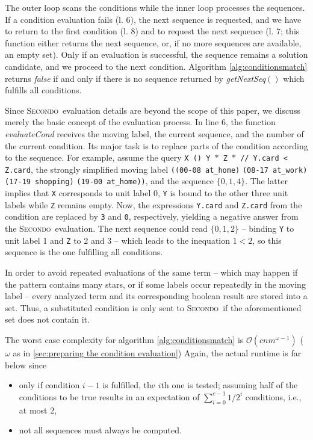 \documentclass{sig-alternate}
\newcommand{\ic}[1]{\textit{#1}}
\newcommand{\secondo}{\textsc{Secondo}}
\begin{document}
The outer loop scans the conditions while the inner loop processes the sequences. If a condition evaluation fails (l. 6), the next sequence is requested, and we have to return to the first condition (l. 8) and to request the next sequence (l. 7; this function either returns the next sequence, or, if no more sequences are available, an empty set). Only if an evaluation is successful, the sequence remains a solution candidate, and we proceed to the next condition. Algorithm \ref{alg:conditionsmatch} returns \ic{false} if and only if there is no sequence returned by \ic{getNextSeq$()$} which fulfills all conditions.

Since \secondo\ evaluation details are beyond the scope of this paper, we discuss merely the basic concept of the evaluation process. In line 6, the function \ic{evaluateCond} receives the moving label, the current sequence, and the number of the current condition. Its major task is to replace parts of the condition according to the sequence. For example, assume the query \texttt{X () Y $\ast$ Z $\ast$ // Y.card < Z.card}, the strongly simplified moving label \texttt{((00-08 at\_home)} \texttt{(08-17 at\_work)} \texttt{(17-19 shopping)} \texttt{(19-00 at\_home))}, and the sequence $\{0,1,4\}$. The latter implies that \texttt{X} corresponds to unit label 0, \texttt{Y} is bound to the other three unit labels while \texttt{Z} remains empty. Now, the expressions \texttt{Y.card} and \texttt{Z.card} from the condition are replaced by \texttt{3} and \texttt{0}, respectively, yielding a negative answer from the \secondo\ evaluation. The next sequence could read $\{0,1,2\}$ -- binding \texttt{Y} to unit label 1 and \texttt{Z} to 2 and 3 -- which leads to the inequation $1<2$, so this sequence is the one fulfilling all conditions.

In order to avoid repeated evaluations of the same term -- which may happen if the pattern contains many stars, or if some labels occur repeatedly in the moving label -- every analyzed term and its corresponding boolean result are stored into a set. Thus, a substituted condition is only sent to \secondo\ if the aforementioned set does not contain it.

The worst case complexity for algorithm \ref{alg:conditionsmatch} is $\mathcal O(cnm^{\omega-1})$ ($\omega$ as in \ref{sec:preparing the condition evaluation}) Again, the actual runtime is far below since
\begin{itemize}
  \item only if condition $i-1$ is fulfilled, the $i$th one is tested; assuming half of the conditions to be true results in an expectation of $\sum_{i=0}^{c-1}1/2^i$ conditions, i.e., at most 2,
  \item not all sequences must always be computed.
\end{itemize}
\end{document}
